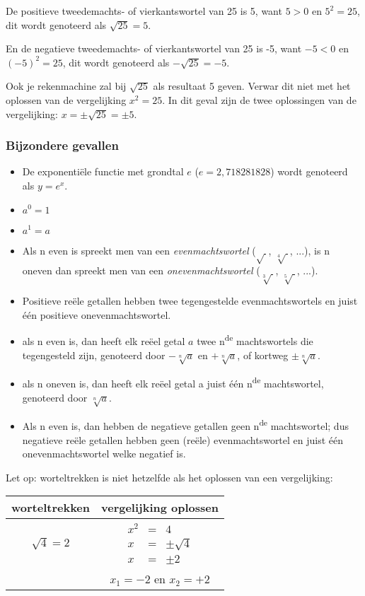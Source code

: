 \begin{opmerking}
De positieve tweedemachts- of vierkantswortel van 25 is 5, want $5>0$ en $5^{2}=25$, dit wordt genoteerd als ${\displaystyle \sqrt{25}=5}$.

En de negatieve tweedemachts- of vierkantswortel van 25 is -5, want
$-5 < 0$ en $(-5)^{2}=25$, dit wordt genoteerd als ${\displaystyle -\sqrt{25}=-5}$.

Ook je rekenmachine zal bij ${\displaystyle \sqrt{25}}$ als resultaat
5 geven. Verwar dit niet met het oplossen van de vergelijking $x^{2}=25$.
In dit geval zijn de twee oplossingen van de vergelijking: $x=\pm\sqrt{25}=\pm5$.
\end{opmerking}

\subsubsection{Bijzondere gevallen}
\begin{itemize}
\item De exponenti\"ele functie met grondtal $e$ ($e=2,718281828$) wordt
genoteerd als $y=e^{x}$.
\item $a^{0}=1$
\item $a^{1}=a$
\item Als n even is spreekt men van een \emph{evenmachtswortel} ($\sqrt{\ }$,
$\sqrt[4]{\ }$, ...), is n oneven dan spreekt men van een \emph{onevenmachtswortel}
($\sqrt[3]{\ }$, $\sqrt[5]{\ }$, ...).
\item Positieve re\"ele getallen hebben twee tegengestelde evenmachtswortels
en juist \'e\'en positieve onevenmachtswortel.
\item als n even is, dan heeft elk re\"eel getal $a$ twee n\textsuperscript{de}
machtswortels die tegengesteld zijn, genoteerd door $-\sqrt[n]{a}$
en $+\sqrt[n]{a}$, of kortweg $\pm\sqrt[n]{a}$.
\item als n oneven is, dan heeft elk re\"eel getal a juist \'e\'en n\textsuperscript{de}
machtswortel, genoteerd door $\sqrt[n]{a}$.
\item Als n even is, dan hebben de negatieve getallen geen n\textsuperscript{de}
machtswortel; dus negatieve re\"ele getallen hebben geen (re\"ele) evenmachtswortel
en juist \'e\'en onevenmachtswortel welke negatief is.
\end{itemize}
Let op: worteltrekken is niet hetzelfde als het oplossen van een vergelijking:

\begin{tabel}{}
\begin{tabular}{c|c}
worteltrekken & vergelijking oplossen\\
\hline 
$\sqrt{4}=2$ & $\begin{array}{lll}
x^{2} & = & 4\\
x & = & \pm\sqrt{4}\\
x & = & \pm2
\end{array}$\\
\hline 
 &  $x_{1}=-2$ en $x_{2}=+2$\\
\end{tabular}
\end{tabel}


